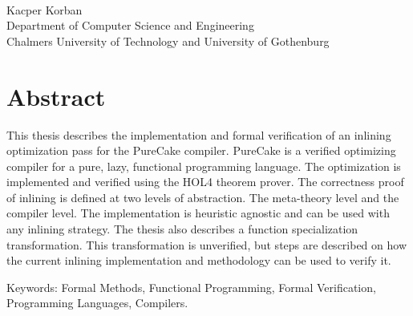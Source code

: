 \oneLineTitle\\
Kacper Korban\\
Department of Computer Science and Engineering\\
Chalmers University of Technology and University of Gothenburg\setlength{\parskip}{0.5cm}

\thispagestyle{plain}			%
\setlength{\parskip}{0pt plus 1.0pt}
\section*{Abstract}
This thesis describes the implementation and formal verification of an inlining optimization pass for the PureCake compiler. PureCake is a verified optimizing compiler for a pure, lazy, functional programming language. The optimization is implemented and verified using the HOL4 theorem prover. The correctness proof of inlining is defined at two levels of abstraction. The meta-theory level and the compiler level. The implementation is heuristic agnostic and can be used with any inlining strategy. The thesis also describes a function specialization transformation. This transformation is unverified, but steps are described on how the current inlining implementation and methodology can be used to verify it.

\vfill
Keywords: Formal Methods, Functional Programming, Formal Verification, Programming Languages, Compilers.

\newpage				%
\thispagestyle{empty}
\mbox{}